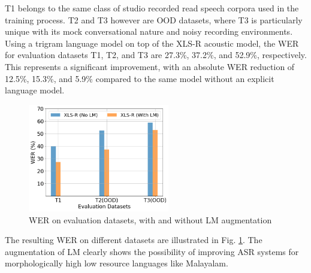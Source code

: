\documentclass[runningheads]{llncs}
\begin{document}
T1 belongs to the same class of studio recorded read speech corpora used in the training process. T2 and T3 however are OOD datasets, where T3 is particularly unique with its mock conversational nature and noisy recording environments. Using a trigram language model on top of the XLS-R acoustic model, the WER for evaluation datasets T1, T2, and T3 are 27.3\%, 37.2\%, and 52.9\%, respectively. This represents a significant improvement, with an absolute WER reduction of 12.5\%, 15.3\%, and 5.9\% compared to the same model without an explicit language model.

\begin{figure}[htpb]
    \centering
    \includegraphics[width=0.55\textwidth]{wer.png}
    \caption{WER on evaluation datasets, with and without LM augmentation}
    \label{Fig:WEReval}

\end{figure}

The resulting WER on different datasets are illustrated in Fig. \ref{Fig:WEReval}. The augmentation of LM clearly shows the possibility of improving ASR systems for morphologically high low resource languages like Malayalam.


\end{document}
